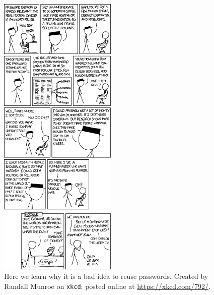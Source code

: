 \begin{figure}[t]
\centering
    \includegraphics[width=0.5\textwidth]{figures/xkcd/xkcd_792_password_reuse.png}
    \caption[\texttt{xkcd} Password Reuse]{Here we learn
        why it is a bad idea to reuse passwords.
        Created by Randall Munroe on \texttt{xkcd};
        posted online at \url{https://xkcd.com/792/}.
        }
    \label{fig:xkcd_password_reuse}
\end{figure}
